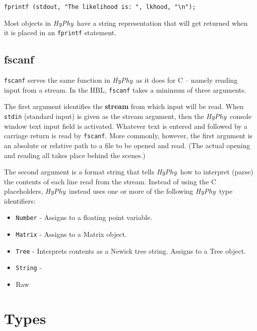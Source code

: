 \documentclass[12pt]{book}
\newcommand{\hyphy}{\textit{HyPhy}}
\begin{document}
\begin{leftbar}
\begin{verbatim}
fprintf (stdout, "The likelihood is: ", lkhood, "\n");
\end{verbatim}
\end{leftbar}

Most objects in \hyphy\ have a string representation that will get returned when it is placed in an {\tt fprintf} statement.  

\subsection {fscanf}

{\tt fscanf} serves the same function in \hyphy\ as it does for C -- namely reading input from a stream.  In the HBL, {\tt fscanf} takes a minimum of three arguments.  

The first argument identifies the {\bf stream} from which input will be read.  When {\tt stdin} (standard input) is given as the stream argument, then the \hyphy\ console window text input field is activated.  Whatever text is entered and followed by a carriage return is read by {\tt fscanf}.  More commonly, however, the first argument is an absolute or relative path to a file to be opened and read.  (The actual opening and reading all takes place behind the scenes.)  

The second argument is a format string that tells \hyphy\ how to interpret (parse) the contents of each line read from the stream.  Instead of using the C placeholders, \hyphy\ instead uses one or more of the following \hyphy\ type identifiers:

\begin{itemize}
\item {\tt Number} - Assigns to a floating point variable.
\item {\tt Matrix} - Assigns to a Matrix object.
\item {\tt Tree} - Interprets contents as a Newick tree string.  Assigns to a Tree object.
\item {\tt String} - 
\item Raw
\end{itemize}



\section {Types}
\end{document}
